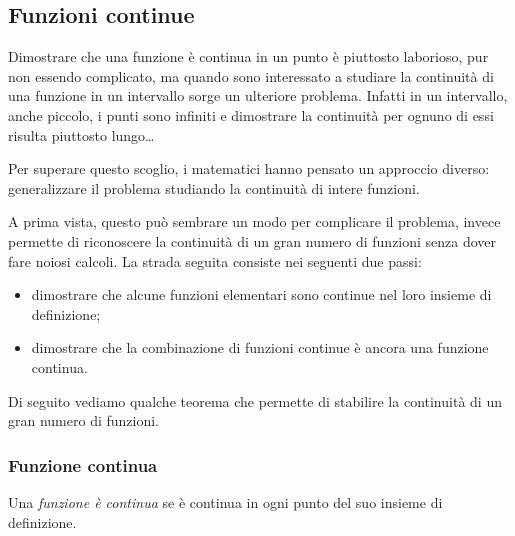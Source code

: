 \begin{comment}
\begin{teorema}[Derivabilità e continuità]
Se una funzione è derivabile in un punto allora è continua in quel punto.
\end{teorema}

\noindent Ipotesi: 
\(f(x) \text{ è derivabile in } c\)
\tab Tesi: 
\(f(x) \text{ è continua in } c\).

\emph{Dimostrazione}
TODO

\end{comment}

\subsection{Funzioni continue}
\label{subsec:cont_definizione}

Dimostrare che una funzione è continua in un punto è piuttosto laborioso, 
pur non essendo complicato, ma quando sono interessato a studiare la 
continuità di una funzione in un intervallo sorge un ulteriore problema. 
Infatti in un intervallo, anche piccolo, i punti sono infiniti e dimostrare 
la continuità per ognuno di essi risulta piuttosto lungo\dots

Per superare questo scoglio, i matematici hanno pensato un approccio 
diverso:
generalizzare il problema studiando la continuità di intere funzioni.

A prima vista, questo può sembrare un modo per complicare il problema, 
invece permette di riconoscere la continuità di un gran numero di 
funzioni senza dover fare noiosi calcoli. La strada seguita consiste nei 
seguenti due passi:
\begin{itemize} [noitemsep]
\item dimostrare che alcune funzioni elementari sono continue nel loro 
insieme di definizione;
\item dimostrare che la combinazione di funzioni continue è ancora una 
funzione continua.
\end{itemize}
Di seguito vediamo qualche teorema che permette di stabilire la continuità di 
un gran numero di funzioni.

\subsubsection{Funzione continua}
\label{subsubsec:cont_funzionecontinua}

\begin{definizione}
Una \emph{funzione è continua} se è continua in ogni punto del suo 
insieme di definizione.
\end{definizione}

